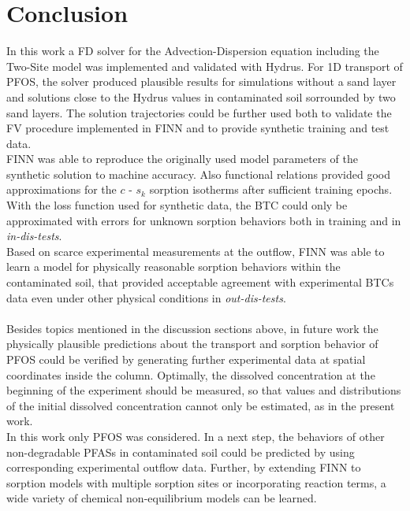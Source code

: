 \section{Conclusion}
In this work a FD solver for the Advection-Dispersion equation including the Two-Site model was implemented and validated with Hydrus. For 1D transport of PFOS, the solver produced plausible results for simulations without a sand layer and solutions close to the Hydrus values in contaminated soil sorrounded by two sand layers. The solution trajectories could be further used both to validate the FV procedure implemented in FINN and to provide synthetic training and test data.\\
FINN was able to reproduce the originally used model parameters of the synthetic solution to machine accuracy. Also functional relations provided good approximations for the $c$ - $s_k$ sorption isotherms after sufficient training epochs. With the loss function used for synthetic data, the BTC could only be approximated with errors for unknown sorption behaviors both in training and in \textit{in-dis-tests}.\\
Based on scarce experimental measurements at the outflow, FINN was able to learn a model for physically reasonable sorption behaviors within the contaminated soil, that provided acceptable agreement with experimental BTCs data even under other physical conditions in \textit{out-dis-tests}.\\
\\
Besides topics mentioned in the discussion sections above, in future work the physically plausible predictions about the transport and sorption behavior of PFOS could be verified by generating further experimental data at spatial coordinates inside the column. Optimally, the dissolved concentration at the beginning of the experiment should be measured, so that values and distributions of the initial dissolved concentration cannot only be estimated, as in the present work.\\
In this work only PFOS was considered. In a next step, the behaviors of other non-degradable PFASs in contaminated soil could be predicted by using corresponding experimental outflow data. Further, by extending FINN to sorption models with multiple sorption sites or incorporating reaction terms, a wide variety of chemical non-equilibrium models can be learned.\\